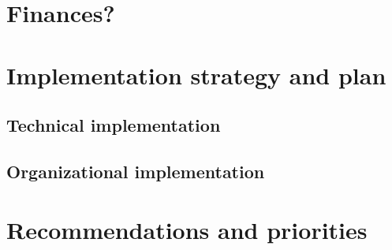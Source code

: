 \section{Finances?}


\section{Implementation strategy and plan}
\subsection{Technical implementation}
\subsection{Organizational implementation}

\section{Recommendations and priorities}

\newpage
